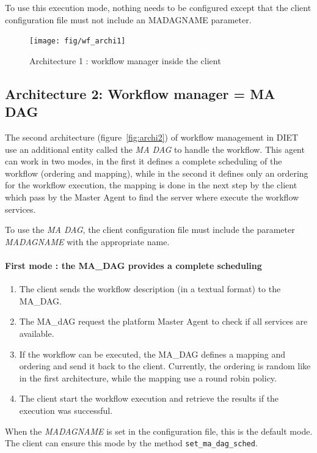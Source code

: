 To use this execution mode, nothing needs to be configured except that
the client configuration file must not include an MADAGNAME parameter.

\begin{figure}[htbp]
  \centering
  \texttt{[image: fig/wf\_archi1]}
  \caption{Architecture 1 : workflow manager inside the client}
  \label{fig:archi1}
\end{figure}



\subsection{Architecture 2: Workflow manager = MA DAG}
\label{sec:archi2}

The second architecture (figure~\ref{fig:archi2}) of workflow
management in DIET use an additional entity called the \textit{MA DAG}
to handle the workflow. This agent can work in two modes, in the first
it defines a complete scheduling of the workflow (ordering and
mapping), while in the second it defines only an ordering for the
workflow execution, the mapping is done in the next step by the client
which pass by the Master Agent to find the server where execute the
workflow services.


To use the \textit{MA DAG}, the client configuration file must include
the parameter \textit{MADAGNAME} with the appropriate name.

\paragraph{First mode : the MA\_DAG provides a complete scheduling}

\begin{enumerate}
\item The client sends the workflow description (in a textual format)
  to the MA\_DAG.
\item The MA\_dAG request the platform Master Agent to check if all
  services are available.
\item If the workflow can be executed, the MA\_DAG defines a mapping and
  ordering and send it back to the client. Currently, the ordering is
  random like in the first architecture, while the mapping use a round
  robin policy.
\item The client start the workflow execution and retrieve the results
  if the execution was successful.
\end{enumerate}

When the \textit{MADAGNAME} is set in the configuration file, this is
the default mode. The client can ensure this mode by the method
\texttt{set\_ma\_dag\_sched}. 

